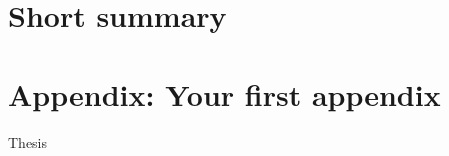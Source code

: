 \documentclass[12pt,a4paper,faculty=ea,language=en,doctype=article]{ugent-doc}
\renewcommand{\ULthickness}{2pt} %
\begin{document}

\maketitle
\renewcommand{\ULthickness}{1pt}


{\hypersetup{hidelinks}\tableofcontents} %
\newpage


\section*{Short summary}



\appendix
\section{Appendix: Your first appendix}
Thesis
\end{document}
